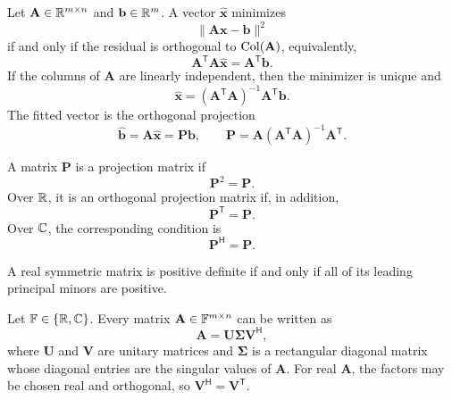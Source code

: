     \begin{theorem}
        Let $\mathbf{A}\in\mathbb{R}^{m\times n}$ and
        $\mathbf{b}\in\mathbb{R}^m$. A vector $\widehat{\mathbf{x}}$ minimizes
        \[
            \|\mathbf{A}\mathbf{x}-\mathbf{b}\|^2
        \]
        if and only if the residual is orthogonal to
        $\operatorname{Col}(\mathbf{A})$, equivalently,
        \[
            \mathbf{A}^{\mathsf T}\mathbf{A}\widehat{\mathbf{x}}
            =
            \mathbf{A}^{\mathsf T}\mathbf{b}.
        \]
        If the columns of $\mathbf{A}$ are linearly independent, then the
        minimizer is unique and
        \[
            \widehat{\mathbf{x}}
            =
            (\mathbf{A}^{\mathsf T}\mathbf{A})^{-1}
            \mathbf{A}^{\mathsf T}\mathbf{b}.
        \]
        The fitted vector is the orthogonal projection
        \[
            \widehat{\mathbf{b}}
            =
            \mathbf{A}\widehat{\mathbf{x}}
            =
            \mathbf{P}\mathbf{b},
            \qquad
            \mathbf{P}
            =
            \mathbf{A}(\mathbf{A}^{\mathsf T}\mathbf{A})^{-1}
            \mathbf{A}^{\mathsf T}.
        \]
    \end{theorem}

    \begin{proposition}
        A matrix $\mathbf{P}$ is a projection matrix if
        \[
            \mathbf{P}^2=\mathbf{P}.
        \]
        Over $\mathbb{R}$, it is an orthogonal projection matrix if, in addition,
        \[
            \mathbf{P}^{\mathsf T}=\mathbf{P}.
        \]
        Over $\mathbb{C}$, the corresponding condition is
        \[
            \mathbf{P}^{\mathsf H}=\mathbf{P}.
        \]
    \end{proposition}

    \begin{theorem}
        A real symmetric matrix is positive definite if and only if all of its
        leading principal minors are positive.
    \end{theorem}

    \begin{theorem}
        Let $\mathbb{F}\in\{\mathbb{R},\mathbb{C}\}$. Every matrix
        $\mathbf{A}\in\mathbb{F}^{m\times n}$ can be
        written as
        \[
            \mathbf{A}
            =
            \mathbf{U}\boldsymbol{\Sigma}\mathbf{V}^{\mathsf H},
        \]
        where $\mathbf{U}$ and $\mathbf{V}$ are unitary matrices and
        $\boldsymbol{\Sigma}$ is a rectangular diagonal matrix whose diagonal
        entries are the singular values of $\mathbf{A}$. For real
        $\mathbf{A}$, the factors may be chosen real and orthogonal, so
        $\mathbf{V}^{\mathsf H}=\mathbf{V}^{\mathsf T}$.
    \end{theorem}

